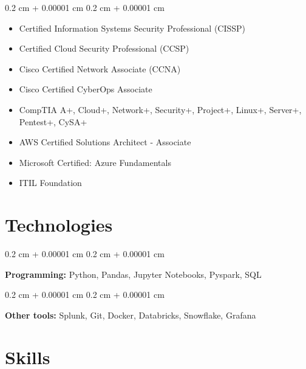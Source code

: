 \documentclass[10pt, letterpaper]{article}
\newenvironment{highlightsforbulletentries}{
    \begin{itemize}[
        topsep=0.10 cm,
        parsep=0.10 cm,
        partopsep=0pt,
        itemsep=0pt,
        leftmargin=10pt
    ]
}{
    \end{itemize}
} %
\newenvironment{onecolentry}{
    \begin{adjustwidth}{
        0.2 cm + 0.00001 cm
    }{
        0.2 cm + 0.00001 cm
    }
}{
    \end{adjustwidth}
} %
\begin{document}
    \begin{onecolentry}
        \begin{highlightsforbulletentries}


        \item Certified Information Systems Security Professional (CISSP)

        \item Certified Cloud Security Professional (CCSP)

        \item Cisco Certified Network Associate (CCNA)

        \item Cisco Certified CyberOps Associate

        \item CompTIA A+, Cloud+, Network+, Security+, Project+, Linux+, Server+, Pentest+, CySA+

        \item AWS Certified Solutions Architect - Associate

        \item Microsoft Certified: Azure Fundamentals

        \item ITIL Foundation


        \end{highlightsforbulletentries}
    \end{onecolentry}

    \section{Technologies}



        
        \begin{onecolentry}
            \textbf{Programming:} Python, Pandas, Jupyter Notebooks, Pyspark, SQL
        \end{onecolentry}

        \vspace{0.2 cm}

        \begin{onecolentry}
            \textbf{Other tools:} Splunk, Git, Docker, Databricks, Snowflake, Grafana
        \end{onecolentry}


    
    \section{Skills}
\end{document}
